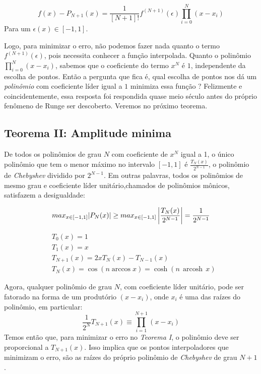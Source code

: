  \begin{equation}
 f(x) - P_{N+1}(x) = \frac{1}{[N+1]!}f^{(N+1)}(\epsilon)\prod^{N}_{i = 0} (x - x_i)
 \end{equation}
 Para um $\epsilon(x) \in [-1,1]$.
 
 Logo, para minimizar o erro, não podemos fazer nada quanto o termo $f^{(N+1)}(\epsilon)$, pois necessita conhecer a função interpolada. Quanto o polinômio $\prod^{N}_{i = 0} (x - x_i)$, sabemos que o coeficiente do termo $x^N$ é $1$, independente da escolha de pontos. Então a pergunta que fica é, qual escolha de pontos nos dá um \emph{polinômio} com coeficiente líder igual a $1$ minimiza essa função ? Felizmente e coincidentemente, essa resposta foi respondida quase meio século antes do próprio fenômeno de Runge ser descoberto. Veremos no próximo teorema.

 
\subsection{Teorema II: Amplitude minima}
 De todos os polinômios de grau $N$ com coeficiente de $x^N$ igual a 1, o único polinômio que tem o menor máximo no intervalo $[-1,1]$ é $\frac{T_N(x)}{2^{N-1}}$, o polinômio de \emph{Chebyshev}  dividido por $2^{N-1}$. Em outras palavras, todos os polinômios de mesmo grau e coeficiente líder unitário,chamados de polinômios mônicos, satisfazem a desigualdade:

\begin{equation}
	max_{x \in [-1,1]}|P_N(x)| \geq  max_{x \in [-1,1]} \left |\frac{T_N(x)}{2^{N-1}}  \right |  = \frac{1}{2^{N-1}}\\
\end{equation}

\begin{align}
    &T_0(x) = 1\\
    &T_1(x) = x\\
    &T_{N+1}(x) = 2xT_N(x) - T_{N-1}(x)\\
    &T_{N}(x) =\cos(n \arccos x)=\cosh(n\,\operatorname{arcosh}\,x)
\end{align}

 Agora, qualquer polinômio de grau $N$, com coeficiente líder unitário, pode ser fatorado na forma de um produtório  $(x - x_i)$, onde $x_i$ é uma das raízes do polinômio, em particular: 
 \begin{equation}
 \frac{1}{2^N}T_{N+1}(x) \equiv \prod_{i = 1}^{N+1} (x-x_i)
 \end{equation}
 Temos então que, para minimizar o erro no \emph{Teorema I}, o polinômio deve ser proporcional a $T_{N+1}(x)$. Isso implica que  os pontos interpoladores que minimizam o erro, são as raízes do próprio polinômio de \emph{Chebyshev} de grau $N+1$.
 
